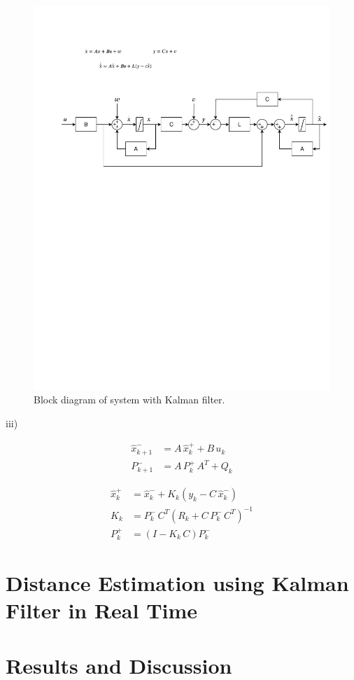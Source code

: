 \documentclass[fleqn,10pt]{olplainarticle}
\begin{document}
\begin{figure}[H]
\centering
\includegraphics[width=\linewidth]{figures/ContinuousKalman.pdf}
\caption{Block diagram of system with Kalman filter.}
\label{fig_continuous_kalman}
\end{figure}


iii) 

\begin{align}
    \hat{x}_{k+1}^- &= A \, \hat{x}_k^+ + B \, u_k \nonumber\\
    P_{k+1}^- &= A\, P_k^+ \, A^T + Q_k
\end{align}

\begin{align}
    \hat{x}_k^+ &= \hat{x}_k^- + K_k (y_k - C \, \hat{x}_k^-)\nonumber\\
    K_k &= P_k^- \, C^T (R_k + C \,P_k^- \, C^T)^{-1}\nonumber\\
    P_k^+ &= (I -K_k \, C) P_k^-
\end{align}



\section{Distance Estimation using Kalman Filter in Real Time}

\section{Results and Discussion}




\end{document}
